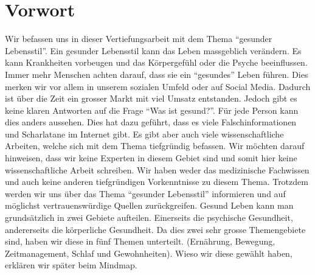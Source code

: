\chapter{Vorwort}
\authortoc{\dario}{\chapterident}
Wir befassen uns in dieser Vertiefungsarbeit mit dem Thema “gesunder Lebensstil”.
\newline
Ein gesunder Lebensstil kann das Leben massgeblich verändern. Es kann Krankheiten vorbeugen und das Körpergefühl oder die Psyche beeinflussen.
\newline
Immer mehr Menschen achten darauf, dass sie ein “gesundes” Leben führen. Dies merken wir vor allem in unserem sozialen Umfeld oder auf Social Media.
\newline
Dadurch ist über die Zeit ein grosser Markt mit viel Umsatz entstanden.
\newline
Jedoch gibt es keine klaren Antworten auf die Frage “Was ist gesund?”. Für jede Person kann dies anders aussehen. 
\newline
Dies hat dazu geführt, dass es viele Falschinformationen und Scharlatane im Internet gibt.
\newline
Es gibt aber auch viele wissenschaftliche Arbeiten, welche sich mit dem Thema tiefgründig befassen.
\newline
Wir möchten darauf hinweisen, dass wir keine Experten in diesem Gebiet sind und somit hier keine wissenschaftliche Arbeit schreiben. Wir haben weder das medizinische Fachwissen und auch keine anderen tiefgründigen Vorkenntnisse zu diesem Thema.
\newline
Trotzdem werden wir uns über das Thema “gesunder Lebensstil” informieren und auf möglichst vertrauenswürdige Quellen zurückgreifen.
\newline
Gesund Leben kann man grundsätzlich in zwei Gebiete aufteilen. Einerseits die psychische Gesundheit, andererseits die körperliche Gesundheit. Da dies zwei sehr grosse Themengebiete sind, haben wir diese in fünf Themen unterteilt.
\newline
(Ernährung, Bewegung, Zeitmanagement, Schlaf und Gewohnheiten). Wieso wir diese gewählt haben, erklären wir später beim Mindmap.